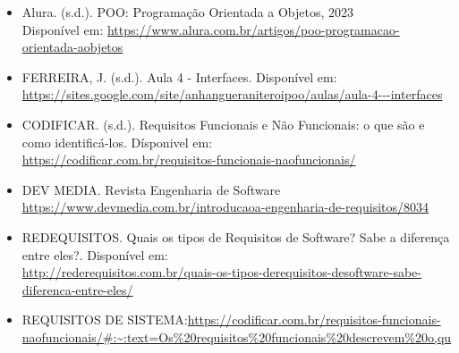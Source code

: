 \documentclass[
	12pt,				%
	openright,			%
	twoside,			%
	a4paper,			%
	english,			%
	brazil				%
	]{abntex2}
\begin{document}
\begin{itemize}
    \item Alura. (s.d.). POO: Programação Orientada a Objetos, 2023 \\
	Disponível em: \url{https://www.alura.com.br/artigos/poo-programacao-orientada-aobjetos}
    \item FERREIRA, J. (s.d.). Aula 4 - Interfaces. Disponível em:\\
	\url{https://sites.google.com/site/anhangueraniteroipoo/aulas/aula-4---interfaces}
    \item CODIFICAR. (s.d.). Requisitos Funcionais e Não Funcionais: o que são e como
	identificá-los. Dísponivel em:\\ \url{https://codificar.com.br/requisitos-funcionais-naofuncionais/}
	\item DEV MEDIA. Revista Engenharia de Software
	\url{https://www.devmedia.com.br/introducaoa-engenharia-de-requisitos/8034}
	\item REDEQUISITOS. Quais os tipos de Requisitos de Software? Sabe a diferença
	entre eles?. Disponível em:\\
	\url{http://rederequisitos.com.br/quais-os-tipos-derequisitos-desoftware-sabe-diferenca-entre-eles/}
	\item REQUISITOS DE SISTEMA:\url{https://codificar.com.br/requisitos-funcionais-naofuncionais/#:~:text=Os%20requisitos%20funcionais%20descrevem%20o,qu}
	
\end{itemize}

\printindex
\end{document}
